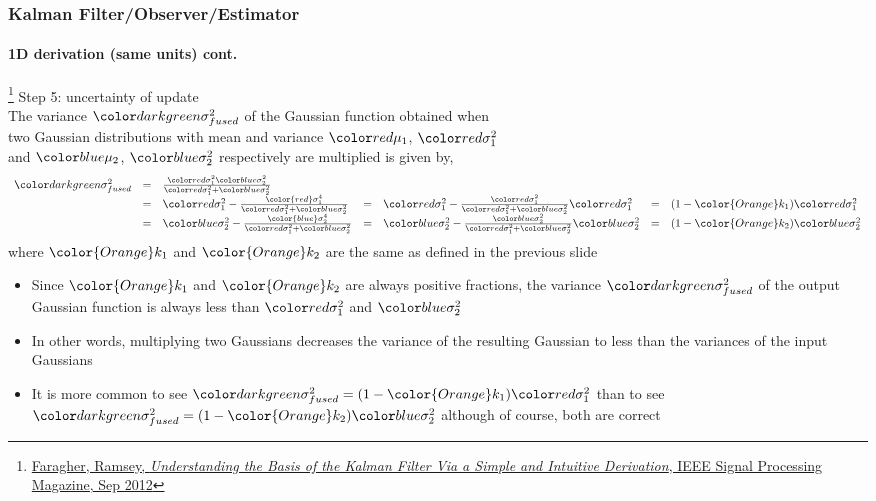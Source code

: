 \documentclass{beamer}
\begin{document}
\begin{frame}
\frametitle{Kalman Filter/Observer/Estimator}
\framesubtitle{1D derivation (same units) \tiny cont.}

\footnote{\tiny\hspace{-0.23in} \href{http://www.cl.cam.ac.uk/~rmf25/papers/Understanding the Basis of the Kalman Filter.pdf}{Faragher, Ramsey, \emph{Understanding the Basis of the Kalman Filter Via a Simple and Intuitive Derivation}, IEEE Signal Processing Magazine, Sep 2012}}
\scriptsize
Step 5: {\color{darkgreen}uncertainty of update}\\
The variance $\varfused$ of the Gaussian function obtained when\\ two Gaussian distributions with mean and variance $\muone$, $\varone$\\ and $\mutwo$, $\vartwo$ respectively are multiplied is given by,
\begin{equation*}
\begin{array}{rlllllll}
\varfused
&=& \frac{\varone \vartwo}{\varone + \vartwo}\\
&=&\varone - \frac{\color{red}\sigma^4_1}{\varone + \vartwo}
&=&\varone-\frac{\varone}{\varone + \vartwo}\varone
&=&(1-{\color{Orange}k_1})\varone\\
&=&\vartwo - \frac{\color{blue}\sigma^4_2}{\varone + \vartwo}
&=&\vartwo-\frac{\vartwo}{\varone + \vartwo}\vartwo
&=&(1-{\color{Orange}k_2})\vartwo
\end{array}
\end{equation*}
where ${\color{Orange}k_1}$ and ${\color{Orange}k_2}$ are the same as defined in the previous slide
\begin{itemize}\scriptsize
\item Since ${\color{Orange}k_1}$ and ${\color{Orange}k_2}$ are always positive fractions, the variance $\varfused$ of the output Gaussian function is always less than $\varone$ and $\vartwo$
\item In other words, multiplying two Gaussians decreases the variance of the resulting Gaussian to less than the variances of the input Gaussians
\item It is more common to see $\varfused=(1-{\color{Orange}k_1})\varone$ than to see $\varfused=(1-{\color{Orange}k_2})\vartwo$ although of course, both are correct
\end{itemize}
\end{frame}
\end{document}
